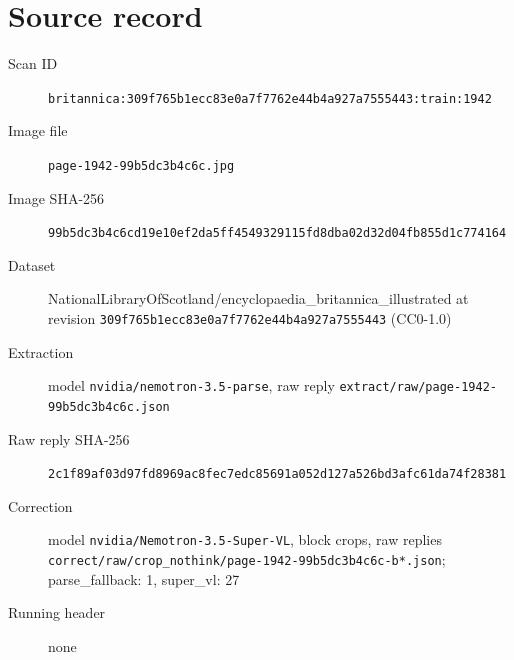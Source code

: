 \documentclass{article}
\begin{document}
\section*{Source record}
\begin{description}
\item[Scan ID] \texttt{britannica:309f765b1ecc83e0a7f7762e44b4a927a7555443:train:1942}
\item[Image file] \texttt{page-1942-99b5dc3b4c6c.jpg}
\item[Image SHA-256] \texttt{99b5dc3b4c6cd19e10ef2da5ff4549329115fd8dba02d32d04fb855d1c774164}
\item[Dataset] NationalLibraryOfScotland/encyclopaedia\_britannica\_illustrated at revision \texttt{309f765b1ecc83e0a7f7762e44b4a927a7555443} (CC0-1.0)
\item[Extraction] model \texttt{nvidia/nemotron-3.5-parse}, raw reply \texttt{extract/raw/page-1942-99b5dc3b4c6c.json}
\item[Raw reply SHA-256] \texttt{2c1f89af03d97fd8969ac8fec7edc85691a052d127a526bd3afc61da74f28381}
\item[Correction] model \texttt{nvidia/Nemotron-3.5-Super-VL}, block crops, raw replies \texttt{correct/raw/crop\_nothink/page-1942-99b5dc3b4c6c-b*.json}; parse\_fallback: 1, super\_vl: 27
\item[Running header] none
\end{description}
\end{document}
